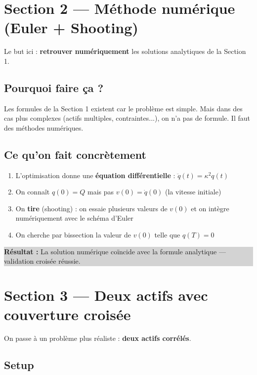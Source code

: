 \documentclass[12pt,a4paper]{article}
\begin{document}
\section{Section 2 — Méthode numérique (Euler + Shooting)}

Le but ici : \textbf{retrouver numériquement} les solutions analytiques de la Section 1.

\subsection{Pourquoi faire ça ?}

Les formules de la Section 1 existent car le problème est simple. Mais dans des cas plus complexes (actifs multiples, contraintes...), on n'a pas de formule. Il faut des méthodes numériques.

\subsection{Ce qu'on fait concrètement}

\begin{enumerate}[noitemsep]
    \item L'optimisation donne une \textbf{équation différentielle} : $\ddot{q}(t) = \kappa^2 q(t)$
    \item On connaît $q(0) = Q$ mais pas $v(0) = \dot{q}(0)$ (la vitesse initiale)
    \item On \textbf{tire} (shooting) : on essaie plusieurs valeurs de $v(0)$ et on intègre numériquement avec le schéma d'Euler
    \item On cherche par bissection la valeur de $v(0)$ telle que $q(T) = 0$
\end{enumerate}

\medskip
\colorbox{lightgray}{\parbox{\linewidth}{\small
\textbf{Résultat :} La solution numérique coïncide avec la formule analytique — validation croisée réussie.
}}

\section{Section 3 — Deux actifs avec couverture croisée}

On passe à un problème plus réaliste : \textbf{deux actifs corrélés}.

\subsection{Setup}
\end{document}
